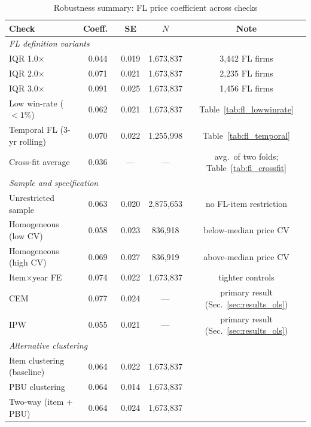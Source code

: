 \begin{table}[htbp]
\centering
\caption{Robustness summary: FL price coefficient across checks}
\label{tab:robustness_summary}
\small
\begin{tabular}{lcccc}
\hline\hline
Check & Coeff.\ & SE & $N$ & Note \\
\hline
\multicolumn{5}{l}{\textit{FL definition variants}} \\
IQR 1.0$\times$ & 0.044 & 0.019 & 1{,}673{,}837 & 3{,}442 FL firms \\
IQR 2.0$\times$ & 0.071 & 0.021 & 1{,}673{,}837 & 2{,}235 FL firms \\
IQR 3.0$\times$ & 0.091 & 0.025 & 1{,}673{,}837 & 1{,}456 FL firms \\
Low win-rate ($<1\%$) & 0.062 & 0.021 & 1{,}673{,}837 & Table~\ref{tab:fl_lowwinrate} \\
Temporal FL (3-yr rolling) & 0.070 & 0.022 & 1{,}255{,}998 & Table~\ref{tab:fl_temporal} \\
Cross-fit average & 0.036 & — & — & avg.\ of two folds; Table~\ref{tab:fl_crossfit} \\
\hline
\multicolumn{5}{l}{\textit{Sample and specification}} \\
Unrestricted sample & 0.063 & 0.020 & 2{,}875{,}653 & no FL-item restriction \\
Homogeneous (low CV) & 0.058 & 0.023 & 836{,}918 & below-median price CV \\
Homogeneous (high CV) & 0.069 & 0.027 & 836{,}919 & above-median price CV \\
Item$\times$year FE & 0.074 & 0.022 & 1{,}673{,}837 & tighter controls \\
CEM & 0.077 & 0.024 & — & primary result (Sec.~\ref{sec:results_ols}) \\
IPW & 0.055 & 0.021 & — & primary result (Sec.~\ref{sec:results_ols}) \\
\hline
\multicolumn{5}{l}{\textit{Alternative clustering}} \\
Item clustering (baseline) & 0.064 & 0.022 & 1{,}673{,}837 & \\
PBU clustering & 0.064 & 0.014 & 1{,}673{,}837 & \\
Two-way (item + PBU) & 0.064 & 0.024 & 1{,}673{,}837 & \\
\hline\hline
\end{tabular}
\end{table}

